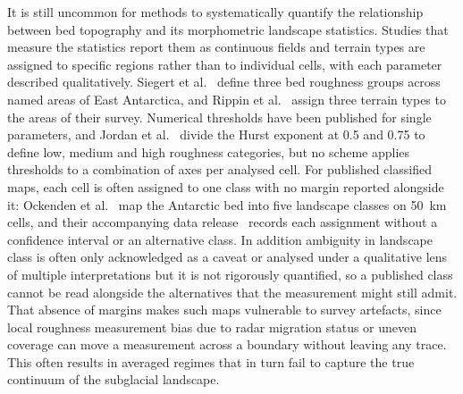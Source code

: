 It is still uncommon for methods to systematically quantify the relationship between bed topography and its morphometric landscape statistics. Studies that measure the statistics report them as continuous fields and terrain types are assigned to specific regions rather than to individual cells, with each parameter described qualitatively. Siegert et al.~\cite{Siegert_2004} define three bed roughness groups across named areas of East Antarctica, and Rippin et al.~\cite{Rippin_2014} assign three terrain types to the areas of their survey. Numerical thresholds have been published for single parameters, and Jordan et al.~\cite{Jordan_2017} divide the Hurst exponent at 0.5 and 0.75 to define low, medium and high roughness categories, but no scheme applies thresholds to a combination of axes per analysed cell. For published classified maps, each cell is often assigned to one class with no margin reported alongside it: Ockenden et al.~\cite{Ockenden_2026} map the Antarctic bed into five landscape classes on 50~km cells, and their accompanying data release~\cite{Ockenden_2025_data} records each assignment without a confidence interval or an alternative class. In addition ambiguity in landscape class is often only acknowledged as a caveat or analysed under a qualitative lens of multiple interpretations but it is not rigorously quantified, so a published class cannot be read alongside the alternatives that the measurement might still admit. That absence of margins makes such maps vulnerable to survey artefacts, since local roughness measurement bias due to radar migration status or uneven coverage can move a measurement across a boundary without leaving any trace. This often results in averaged regimes that in turn fail to capture the true continuum of the subglacial landscape.\\

